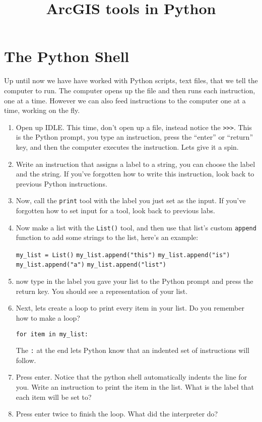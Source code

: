 \documentclass{article}
\begin{document}
\title{ArcGIS tools in Python}
\maketitle

\section{The Python Shell}
Up until now we have have worked with Python scripts, text files, that we tell the computer to run.  The computer opens up the file and then runs each instruction, one at a time.  However we can also feed instructions to the computer one at a time, working on the fly.
\begin{enumerate}
    \item Open up IDLE.  This time, don't open up a file, instead notice the \verb+>>>+.  This is the Python prompt, you type an instruction, press the ``enter'' or ``return'' key, and then the computer executes the instruction.  Lets give it a spin.
    \item Write an instruction that assigns a label to a string, you can choose the label and the string.  If you've forgotten how to write this instruction, look back to previous Python instructions.
    \item Now, call the \verb+print+ tool with the label you just set as the input.  If you've forgotten how to set input for a tool, look back to previous labs.
    \item Now make a list with the \verb+List()+ tool, and then use that list's custom \verb+append+ function to add some strings to the list, here's an example:

    \verb+my_list = List()+
    \verb+my_list.append("this")+
    \verb+my_list.append("is")+
    \verb+my_list.append("a")+
    \verb+my_list.append("list")+

    \item now type in the label you gave your list to the Python prompt and press the return key.  You should see a representation of your list.
    \item Next, lets create a loop to print every item in your list.  Do you remember how to make a loop?

        \verb+for item in my_list:+
    
        The \verb+:+ at the end lets Python know that an indented set of instructions will follow.
    \item Press enter.  Notice that the python shell automatically indents the line for you.  Write an instruction to print the item in the list.  What is the label that each item will be set to?
    \item Press enter twice to finish the loop.  What did the interpreter do?


\end{enumerate}
\end{document}
